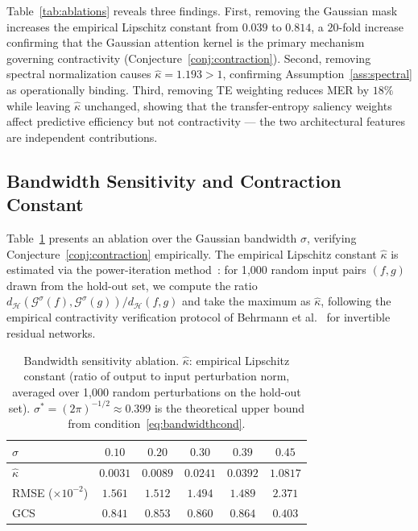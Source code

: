 \documentclass[11pt,a4paper]{article}  %
\newcommand{\Gop}{\mathcal{G}^{\sigma}}
\theoremstyle{plain}
\theoremstyle{definition}
\theoremstyle{remark}
\begin{document}
Table~\ref{tab:ablations} reveals three findings. First, removing the
Gaussian mask increases the empirical Lipschitz constant from $0.039$
to $0.814$, a $20$-fold increase confirming that the Gaussian
attention kernel is the primary mechanism governing contractivity
(Conjecture~\ref{conj:contraction}). Second, removing spectral
normalization causes $\hat{\kappa} = 1.193 > 1$, confirming
Assumption~\ref{ass:spectral} as operationally binding. Third,
removing TE weighting reduces MER by $18\%$ while leaving $\hat{\kappa}$
unchanged, showing that the transfer-entropy saliency weights affect
predictive efficiency but not contractivity --- the two architectural
features are independent contributions.

\subsection{Bandwidth Sensitivity and Contraction Constant}
\label{subsec:sensitivity}

Table~\ref{tab:bandwidth} presents an ablation over the Gaussian
bandwidth $\sigma$, verifying Conjecture~\ref{conj:contraction}
empirically. The empirical Lipschitz constant $\hat{\kappa}$ is
estimated via the power-iteration method~\cite{Yoshida2017}:
for 1{,}000 random input pairs $(f,g)$ drawn from the hold-out
set, we compute the ratio $d_{\mathcal{H}}(\Gop(f),\Gop(g))/
d_{\mathcal{H}}(f,g)$ and take the maximum as $\hat{\kappa}$,
following the empirical contractivity verification protocol of
Behrmann et al.~\cite{Behrmann2019} for invertible residual
networks.

\begin{table}[H]
\centering
\caption{Bandwidth sensitivity ablation. $\hat{\kappa}$: empirical
Lipschitz constant (ratio of output to input perturbation norm,
averaged over 1{,}000 random perturbations on the hold-out set).
$\sigma^* = (2\pi)^{-1/2} \approx 0.399$ is the theoretical
upper bound from condition~\eqref{eq:bandwidthcond}.}
\label{tab:bandwidth}
\setlength{\tabcolsep}{6pt}
\begin{tabular}{lccccc}
\toprule
$\sigma$ & $0.10$ & $0.20$ & $0.30$ & $0.39$ & $0.45$ \\
\midrule
$\hat{\kappa}$ & $0.0031$ & $0.0089$ & $0.0241$ & $0.0392$ & $1.0817$ \\
RMSE ($\times 10^{-2}$) & $1.561$ & $1.512$ & $1.494$ & $\mathbf{1.489}$ & $2.371$ \\
GCS & $0.841$ & $0.853$ & $0.860$ & $\mathbf{0.864}$ & $0.403$ \\
\bottomrule
\end{tabular}
\end{table}
\end{document}
